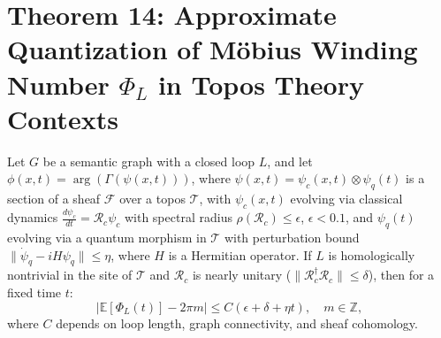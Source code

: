 \documentclass[12pt]{article}
\begin{document}
\section*{Theorem 14: Approximate Quantization of Möbius Winding Number \(\Phi_L\) in Topos Theory Contexts}

\begin{theorem}
Let \(G\) be a semantic graph with a closed loop \(L\), and let \(\phi(x,t) = \arg(\Gamma(\psi(x,t)))\), where \(\psi(x,t) = \psi_c(x,t) \otimes \psi_q(t)\) is a section of a sheaf \(\mathcal{F}\) over a topos \(\mathcal{T}\), with \(\psi_c(x,t)\) evolving via classical dynamics \(\frac{d\psi_c}{dt} = \mathcal{R}_c \psi_c\) with spectral radius \(\rho(\mathcal{R}_c) \leq \epsilon\), \(\epsilon < 0.1\), and \(\psi_q(t)\) evolving via a quantum morphism in \(\mathcal{T}\) with perturbation bound \(\|\dot{\psi}_q - i H \psi_q\| \leq \eta\), where \(H\) is a Hermitian operator. If \(L\) is homologically nontrivial in the site of \(\mathcal{T}\) and \(\mathcal{R}_c\) is nearly unitary (\(\|\mathcal{R}_c^\dagger \mathcal{R}_c\| \leq \delta\)), then for a fixed time \(t\):
\[
\left| \mathbb{E}[\Phi_L(t)] - 2\pi m \right| \leq C (\epsilon + \delta + \eta t), \quad m \in \mathbb{Z},
\]
where \(C\) depends on loop length, graph connectivity, and sheaf cohomology.
\end{theorem}
\end{document}

